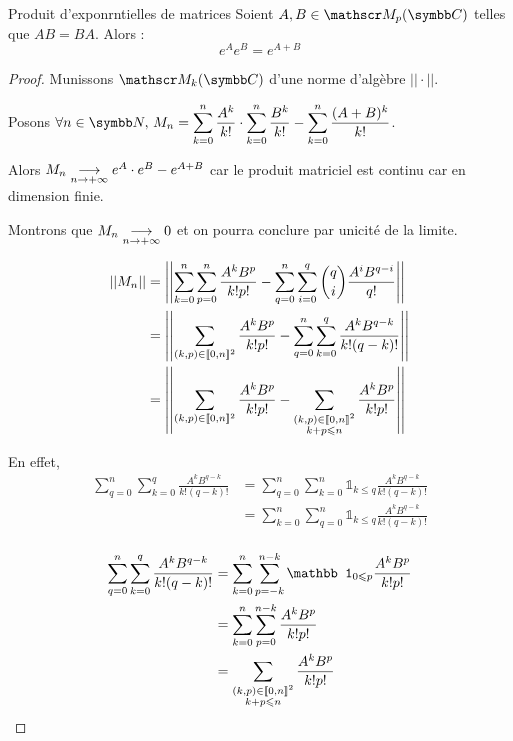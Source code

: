 \begin{corollaire}{Produit d'exponrntielles de matrices}{}
    Soient $A, B \in \mathscr M_p(\C)$ telles que $AB = BA$. 
    Alors :
    \[e^A e^B = e^{A + B}\]
\end{corollaire}

\begin{proof}
    Munissons $\mathscr M_k(\C)$ d'une norme d'algèbre $||\cdot||$. 

    Posons $\displaystyle \forall n \in \N, \, M_n = \sum_{k = 0 }^{n } \frac{A^k}{k!} \cdot \sum_{k = 0 }^{n } \frac{B^k}{k!} - \sum_{k = 0 }^{n }\frac{(A + B)^k}{k!}$.

    Alors $M_n \underset{n \to + \infty}{\longrightarrow} e^A \cdot e^B - e^{A + B}$ car le produit matriciel est continu
    car en dimension finie. 

    Montrons que $M_n \underset{n \to + \infty}{\longrightarrow} 0$ et on pourra conclure par unicité de la limite. 

    \begin{align*}
        ||M_n|| & = \left|\left| \sum_{k = 0 }^{n } \sum_{p = 0 }^{n } \frac{A^k B^p}{k! p!} - \sum_{q = 0}^n \sum_{i = 0 }^{q } \binom q i \frac{A^i B^{q - i}}{q!} \right|\right| \\
                & = \left|\left| \sum_{(k, p) \in [\![0, n]\!]^2} \frac{A^k B^p}{k! p!} - \sum_{q = 0}^n \sum_{k = 0}^q \frac{A^k B^{q - k}}{k! (q - k)!} \right|\right| \\
                & = \left|\left| \sum_{(k, p) \in [\![0, n]\!]^2} \frac{A^k B^p}{k! p!} - \sum_{\substack{(k, p) \in [\![0, n]\!]^2 \\ k + p \leqslant n}} \frac{A^k B^p}{k! p!} \right|\right| \\
    \end{align*}

    En effet,
    \begin{align*}
        \sum_{q = 0}^n \sum_{k = 0}^q \frac{A^k B^{q - k}}{k! (q - k)!} & = \sum_{q= 0}^n \sum_{k = 0}^n \mathbb 1_{k \leqslant q} \frac{A^k B^{q - k}}{k! (q - k)!} \\
         & = \sum_{k = 0}^n \sum_{q = 0}^n \mathbb 1_{k \leqslant q} \frac{A^k B^{q - k}}{k! (q - k)!} \\
    \end{align*}

    \begin{align*}
        \sum_{q = 0}^n \sum_{k = 0}^q \frac{A^k B^{q - k}}{k! (q - k)!} & = \sum_{ k = 0}^n \sum_{p = -k}^{n - k} \mathbb 1_{0 \leqslant p} \frac{A^k B^p}{k! p!} \\
         & = \sum_{ k = 0}^n \sum_{p = 0}^{n - k} \frac{A^k B^p}{k! p!} \\
         & = \sum_{\substack{(k, p) \in \ninter 0 n^2 \\ k + p \leqslant n}} \frac{A^k B^p}{k! p!} \\
    \end{align*}


\end{proof}
